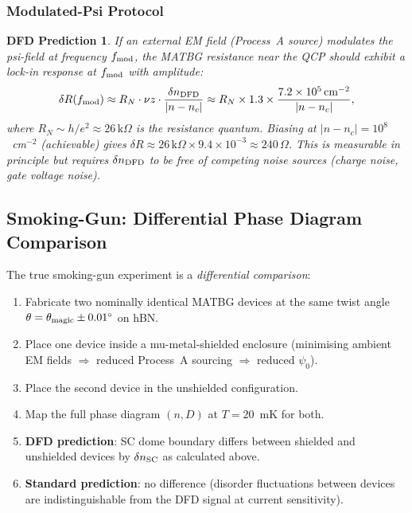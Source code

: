 \documentclass[11pt]{article}
\newtheorem{prediction}{DFD Prediction}
\newcommand{\ee}[1]{\times 10^{#1}}
\newcommand{\tmagic}{\theta_{\rm magic}}
\begin{document}
\subsubsection{Modulated-Psi Protocol}

\begin{prediction}
  \label{pred:mod_psi}
  If an external EM field (Process~A source) modulates the psi-field at
  frequency $f_{\rm mod}$, the MATBG resistance near the QCP should
  exhibit a lock-in response at $f_{\rm mod}$ with amplitude:
  \begin{equation}
    \delta R(f_{\rm mod}) \approx R_N \cdot \nu z \cdot
      \frac{\delta n_{\rm DFD}}{|n - n_c|}
      \approx R_N \times 1.3 \times
      \frac{7.2\ee{5}\,\text{cm}^{-2}}{|n - n_c|},
    \label{eq:dR_lockin}
  \end{equation}
  where $R_N \sim h/e^2 \approx 26\,\text{k}\Omega$ is the resistance
  quantum. Biasing at $|n-n_c| = 10^8$~cm$^{-2}$ (achievable)
  gives $\delta R \approx 26\,\text{k}\Omega \times 9.4\ee{-3}
  \approx 240\,\Omega$. This is measurable in principle but requires
  $\delta n_{\rm DFD}$ to be free of competing noise sources (charge
  noise, gate voltage noise).
\end{prediction}

\subsection{Smoking-Gun: Differential Phase Diagram Comparison}

The true smoking-gun experiment is a \emph{differential comparison}:

\begin{enumerate}
  \item Fabricate two nominally identical MATBG devices at the same
    twist angle $\theta = \tmagic \pm 0.01^\circ$ on hBN.
  \item Place one device inside a mu-metal-shielded enclosure (minimising
    ambient EM fields $\Rightarrow$ reduced Process~A sourcing
    $\Rightarrow$ reduced $\psi_0$).
  \item Place the second device in the unshielded configuration.
  \item Map the full phase diagram $(n, D)$ at $T = 20$~mK for both.
  \item \textbf{DFD prediction}: SC dome boundary differs between shielded
    and unshielded devices by $\delta n_{\rm SC}$ as calculated above.
  \item \textbf{Standard prediction}: no difference (disorder fluctuations
    between devices are indistinguishable from the DFD signal at current
    sensitivity).
\end{enumerate}
\end{document}
